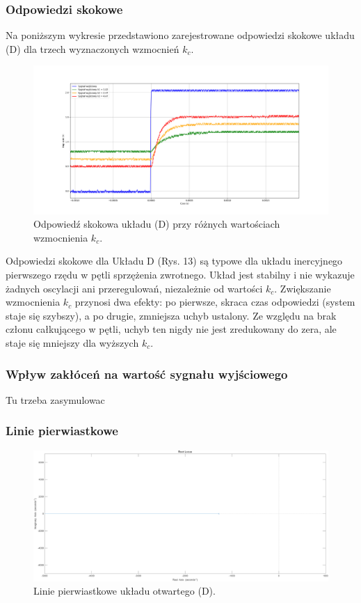 \documentclass[12pt,a4paper]{article}
\begin{document}
	\subsubsection{Odpowiedzi skokowe}
	Na poniższym wykresie przedstawiono zarejestrowane odpowiedzi skokowe układu (D) dla trzech wyznaczonych wzmocnień \(k_c\).
	
	\begin{figure}[H]
	\centering
	\includegraphics[width=1\linewidth]{zdjecia/OdpSkokD.png}
	\caption{Odpowiedź skokowa układu (D) przy różnych wartościach wzmocnienia \(k_c\).}
	\label{fig:OdpSkokD}
	\end{figure}
	
	Odpowiedzi skokowe dla Układu D (Rys. 13) są typowe dla układu inercyjnego pierwszego rzędu w pętli sprzężenia zwrotnego. Układ jest stabilny i nie wykazuje żadnych oscylacji ani przeregulowań, niezależnie od wartości $k_c$. Zwiększanie wzmocnienia $k_c$ przynosi dwa efekty: po pierwsze, skraca czas odpowiedzi (system staje się szybszy), a po drugie, zmniejsza uchyb ustalony. Ze względu na brak członu całkującego w pętli, uchyb ten nigdy nie jest zredukowany do zera, ale staje się mniejszy dla wyższych $k_c$.
	
	\subsubsection{Wpływ zakłóceń na wartość sygnału wyjściowego}
	
		Tu trzeba zasymulowac
		
	
	\subsubsection{Linie pierwiastkowe}
	
	\begin{figure}[H]
		\centering
		\includegraphics[width=0.8\linewidth]{zdjecia/LP_ukladD.png}
		\caption{Linie pierwiastkowe układu otwartego (D).}
		\label{fig:LP_ukladD}
	\end{figure}
	
\end{document}
